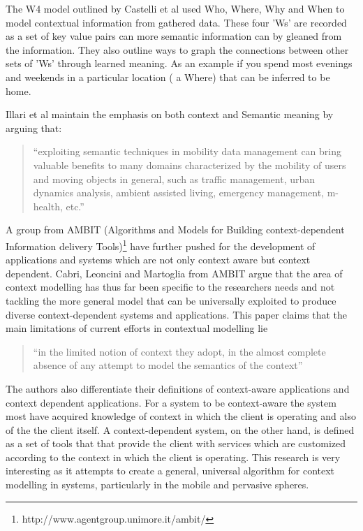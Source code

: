 \documentclass[]{report}
\begin{document}
The W4 model outlined by Castelli et al used Who, Where, Why and When to model contextual information from gathered data. These four 'Ws' are recorded as a set of key value pairs can more semantic information can by gleaned from the information. They also outline ways to graph the connections between other sets of 'Ws' through learned meaning. As an example if you spend most evenings and weekends in a particular location ( a Where) that can be inferred to be home.\par
Illari et al\cite{3} maintain the emphasis on both context and Semantic meaning by arguing that:
\begin{quote}
``exploiting semantic techniques in mobility data management can bring valuable benefits to many domains characterized by the mobility of users and moving objects in general, such as traffic management, urban dynamics analysis, ambient assisted living, emergency management, m-health, etc.''\cite{3}
\end{quote}\par
A group from AMBIT (Algorithms and Models for Building context-dependent Information delivery Tools)\footnote{http://www.agentgroup.unimore.it/ambit/} have further pushed for the development of applications and systems which are not only context aware but context dependent. Cabri, Leoncini and Martoglia \cite{5} from AMBIT argue that the area of context modelling has thus far been specific to the researchers needs and not tackling the more general model that can be universally exploited to produce diverse context-dependent systems and applications. This paper claims that the main limitations of current efforts in contextual modelling lie  \begin{quote}
	``in the limited notion of context they adopt, in the almost complete absence of any attempt to model the semantics of the context''
\end{quote} The authors also differentiate their definitions of context-aware applications and context dependent applications. For a system to be context-aware the system most have acquired knowledge of context in which the client is operating and also of the the client itself. A context-dependent system, on the other hand, is defined as a set of tools that that provide the client with services which are customized  according to the context in which the client is operating. This research is very interesting as it attempts to create a general, universal algorithm for context modelling in systems, particularly in the mobile and pervasive spheres.\par
\end{document}

